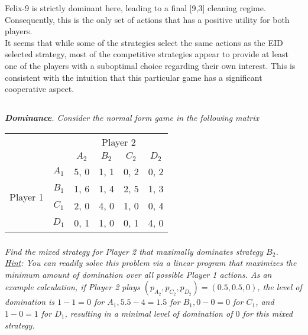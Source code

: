 \documentclass[12pt]{amsart}
\begin{document}
	Felix-9 is strictly dominant here, leading to a final [9,3] cleaning regime. 
	Consequently, this is the only set of actions that has a positive utility for both players. \\
	
	It seems that while some of the strategies select the same actions as the EID selected strategy,
	most of the competitive strategies appear to provide at least one of the players with a suboptimal 
	choice regarding their own interest.
	This is consistent with the intuition that this particular game has a significant cooperative aspect.

\subsection{}
\textit{\textbf{Dominance}. Consider the normal form game in the following matrix}

\begin{center}
	\def\arraystretch{1.25}%
	\begin{tabular}{cccccc}
		&                            &                            & \multicolumn{2}{c}{Player 2}                            &                            \\
		& \multicolumn{1}{c|}{}      & \multicolumn{1}{c|}{$A_2$} & \multicolumn{1}{c|}{$B_2$} & \multicolumn{1}{c|}{$C_2$} & \multicolumn{1}{c|}{$D_2$} \\ \cline{2-6} 
		& \multicolumn{1}{c|}{$A_1$} & \multicolumn{1}{c|}{5, 0}  & \multicolumn{1}{c|}{1, 1}  & \multicolumn{1}{c|}{0, 2}  & \multicolumn{1}{c|}{0, 2}  \\ \cline{2-6} 
		\multirow{2}{*}{Player 1} & \multicolumn{1}{c|}{$B_1$} & \multicolumn{1}{c|}{1, 6}  & \multicolumn{1}{c|}{1, 4}  & \multicolumn{1}{c|}{2, 5}  & \multicolumn{1}{c|}{1, 3}  \\ \cline{2-6} 
		& \multicolumn{1}{c|}{$C_1$} & \multicolumn{1}{c|}{2, 0}  & \multicolumn{1}{c|}{4, 0}  & \multicolumn{1}{c|}{1, 0}  & \multicolumn{1}{c|}{0, 4}  \\ \cline{2-6} 
		& \multicolumn{1}{c|}{$D_1$} & \multicolumn{1}{c|}{0, 1}  & \multicolumn{1}{c|}{1, 0}  & \multicolumn{1}{c|}{0, 1}  & \multicolumn{1}{c|}{4, 0}  \\ \cline{2-6} 
	\end{tabular}
\end{center}

	\subsubsection{}
	\textit{Find the mixed strategy for Player 2 that maximally dominates strategy $B_2$. \\[3ex] %
%
	\underline{Hint}: You can readily solve this problem via a linear program that maximizes the
	minimum amount of domination over all possible Player 1 actions. As an example
	calculation, if Player 2 plays $(p_{A_2},p_{C_2},p_{D_2}) = (0.5,0.5,0)$, 
	the level of domination is $1 − 1 = 0$ for $A_1, 5.5 - 4 = 1.5$ for 
	$B_1, 0 - 0 = 0$ for $C_1$, and $1 − 0 = 1$ for $D_1$, resulting in a
	minimal level of domination of $0$ for this mixed strategy.}
	
\end{document}
